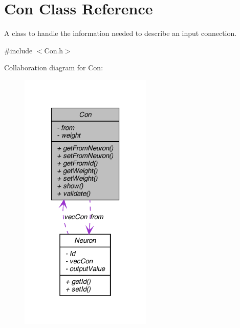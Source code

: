 \hypertarget{class_con}{
\section{Con Class Reference}
\label{class_con}
}


A class to handle the information needed to describe an input connection.  




{\ttfamily \#include $<$Con.h$>$}



Collaboration diagram for Con:\nopagebreak
\begin{figure}[H]
\begin{center}
\leavevmode
\includegraphics[width=178pt]{class_con__coll__graph}
\end{center}
\end{figure}
